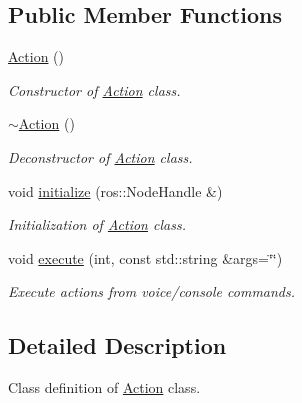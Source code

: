 \subsection*{Public Member Functions}
\begin{DoxyCompactItemize}
\item 
\hyperlink{classAction_a4f457ccfc8336b565cadca56b36e0271}{Action} ()
\begin{DoxyCompactList}\small\item\em Constructor of \hyperlink{classAction}{Action} class. \end{DoxyCompactList}\item 
\hyperlink{classAction_acdb06775d157339256a8ecd55749226c}{$\sim$\-Action} ()
\begin{DoxyCompactList}\small\item\em Deconstructor of \hyperlink{classAction}{Action} class. \end{DoxyCompactList}\item 
void \hyperlink{classAction_a43b331fb5dcad4544e9983cef0eb1532}{initialize} (ros\-::\-Node\-Handle \&)
\begin{DoxyCompactList}\small\item\em Initialization of \hyperlink{classAction}{Action} class. \end{DoxyCompactList}\item 
void \hyperlink{classAction_a26d6a276da57703cc18ff7f62e10f582}{execute} (int, const std\-::string \&args=\char`\"{}\char`\"{})
\begin{DoxyCompactList}\small\item\em Execute actions from voice/console commands. \end{DoxyCompactList}\end{DoxyCompactItemize}


\subsection{Detailed Description}
Class definition of \hyperlink{classAction}{Action} class. 

